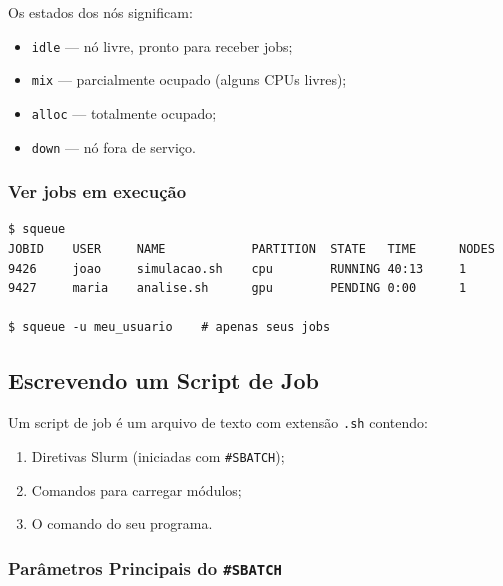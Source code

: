 \documentclass[11pt, a4paper]{article}
\begin{document}
Os estados dos nós significam:
\begin{itemize}[noitemsep]
  \item \texttt{idle} --- nó livre, pronto para receber jobs;
  \item \texttt{mix} --- parcialmente ocupado (alguns CPUs livres);
  \item \texttt{alloc} --- totalmente ocupado;
  \item \texttt{down} --- nó fora de serviço.
\end{itemize}

\subsubsection{Ver jobs em execução}

\begin{lstlisting}[style=terminal]
$ squeue
JOBID    USER     NAME            PARTITION  STATE   TIME      NODES
9426     joao     simulacao.sh    cpu        RUNNING 40:13     1
9427     maria    analise.sh      gpu        PENDING 0:00      1

$ squeue -u meu_usuario    # apenas seus jobs
\end{lstlisting}

\subsection{Escrevendo um Script de Job}

Um script de job é um arquivo de texto com extensão \texttt{.sh} contendo:
\begin{enumerate}
  \item Diretivas Slurm (iniciadas com \texttt{\#SBATCH});
  \item Comandos para carregar módulos;
  \item O comando do seu programa.
\end{enumerate}

\subsubsection{Parâmetros Principais do \texttt{\#SBATCH}}
\end{document}
